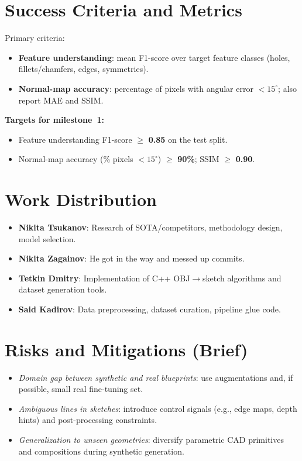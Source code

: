 \documentclass[11pt,a4paper]{article}
\begin{document}
\section{Success Criteria and Metrics}
Primary criteria:
\begin{itemize}[leftmargin=*]
  \item \textbf{Feature understanding}: mean F1-score over target feature classes (holes, fillets/chamfers, edges, symmetries).
  \item \textbf{Normal-map accuracy}: percentage of pixels with angular error $<15^{\circ}$; also report MAE and SSIM.
\end{itemize}

\noindent \textbf{Targets for milestone~1:}
\begin{itemize}[leftmargin=*]
  \item Feature understanding F1-score $\geq$ \textbf{0.85} on the test split.
  \item Normal-map accuracy (\% pixels $<15^{\circ}$) $\geq$ \textbf{90\%}; SSIM $\geq$ \textbf{0.90}.
\end{itemize}

\section{Work Distribution}
\begin{itemize}[leftmargin=*]
  \item \textbf{Nikita Tsukanov}: Research of SOTA/competitors, methodology design, model selection.
  \item \textbf{Nikita Zagainov}: He got in the way and messed up commits.
  \item \textbf{Tetkin Dmitry}: Implementation of C++ OBJ$\rightarrow$sketch algorithms and dataset generation tools.
  \item \textbf{Said Kadirov}: Data preprocessing, dataset curation, pipeline glue code.
\end{itemize}

\section{Risks and Mitigations (Brief)}
\begin{itemize}[leftmargin=*]
  \item \emph{Domain gap between synthetic and real blueprints}: use augmentations and, if possible, small real fine-tuning set.
  \item \emph{Ambiguous lines in sketches}: introduce control signals (e.g., edge maps, depth hints) and post-processing constraints.
  \item \emph{Generalization to unseen geometries}: diversify parametric CAD primitives and compositions during synthetic generation.
\end{itemize}
\end{document}
